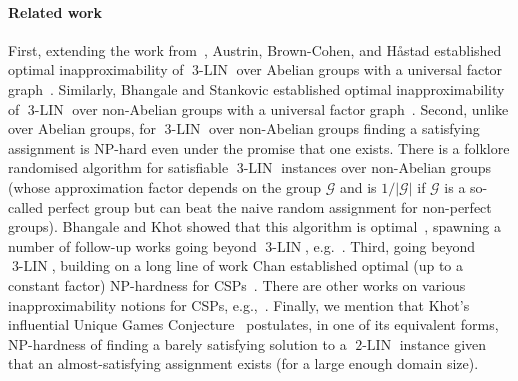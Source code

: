 \documentclass[a4paper,11pt]{article}
\theoremstyle{definition}
\newcommand{\gr}{\mathscr{G}}
\newcommand{\eq}{\ensuremath{\operatorname{3-LIN}}}
\newcommand{\eqqq}{\ensuremath{\operatorname{2-LIN}}}
\begin{document}
\paragraph{Related work}
First, extending the work from~\cite{Hastad01:jacm}, Austrin, Brown-Cohen, and
H{\aa}stad established optimal inapproximability of $\eq$ over Abelian groups
with a universal factor graph~\cite{Austrin23:talg}. Similarly, Bhangale and
Stankovic established optimal inapproximability of $\eq$ over non-Abelian groups
with a universal factor graph~\cite{Bhangale23:algorithmica}.
Second, unlike over Abelian groups, for $\eq$ over non-Abelian groups finding a
satisfying assignment is NP-hard even under the promise that one exists. There
is a folklore randomised algorithm for satisfiable $\eq$ instances over
non-Abelian groups (whose approximation factor depends on the group $\gr$ and is
$1/|\gr|$ if $\gr$ is a so-called perfect group but can beat the naive random assignment for non-perfect groups).
Bhangale and Khot showed that this algorithm is optimal~\cite{Bhangale21:stoc},
spawning a number of follow-up works going beyond $\eq$, e.g.~\cite{Bhangale22:stoc,Bhangale23:stocII,Bhangale23:stocIII}.
Third, going beyond $\eq$, building on a long line of work Chan
established optimal (up to a constant factor) NP-hardness for
CSPs~\cite{Chan16:jacm}. There are other works on various inapproximability notions for
CSPs, e.g.,~\cite{Austrin13:toct,Khot14:stoc,Khot14:icalp}.
Finally, we mention that Khot's influential Unique Games
Conjecture~\cite{Khot02stoc} postulates, in one of its equivalent forms,
NP-hardness of finding a barely satisfying solution to a $\eqqq$ instance given
that an almost-satisfying assignment exists (for a large enough domain size).
\end{document}
